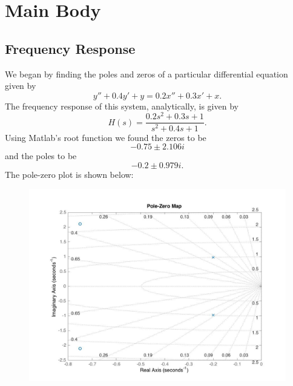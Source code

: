\documentclass{article}
\begin{document}

\section{Main Body}

\subsection{Frequency Response}

We began by finding the poles and zeros of a particular differential equation given by $$y'' + 0.4y' + y = 0.2x'' + 0.3x' + x.$$
The frequency response of this system, analytically, is given by $$H(s) = \frac{0.2s^2 + 0.3s + 1}{s^2 + 0.4s + 1}.$$ Using Matlab's root function we found the zeros to be
 $$-0.75 \pm 2.106 i$$ and the poles to be $$-0.2 \pm 0.979 i.$$ The pole-zero plot is shown below:
 
\begin{figure}[!htbp]
\begin{minipage}{\linewidth}
\includegraphics[width = 1\linewidth, height = 0.4\textheight]{polemap.jpg}
\end{minipage}
\end{figure}
\FloatBarrier
\end{document}
